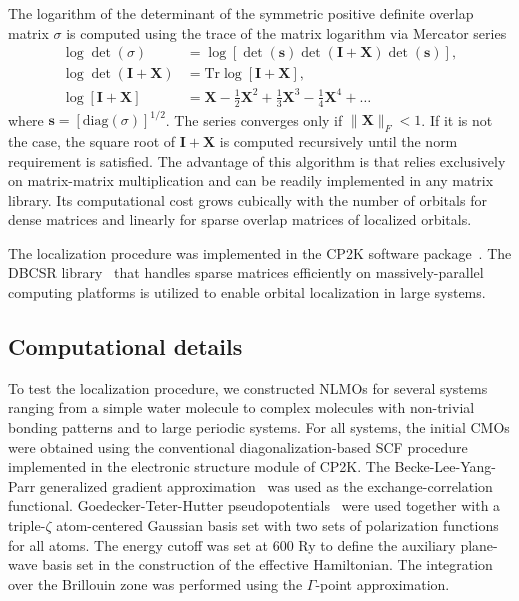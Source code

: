 \documentclass[aps,prl,reprint,amsmath,amssymb]{revtex4-1}
\begin{document}
The logarithm of the determinant of the symmetric positive definite overlap matrix $\sigma$ is computed using the trace of the matrix logarithm via Mercator series
%
\begin{equation} \label{eq:mercator}
\begin{split}
\log \det \left( \sigma \right) &= \log \left[ \det(\mathbf{s}) \det(\mathbf{I} + \mathbf{X}) \det(\mathbf{s}) \right], \\
\log \det \left( \mathbf{I} + \mathbf{X} \right) &= \text{Tr} \log \left[ \mathbf{I} + \mathbf{X} \right], \\
\log \left[ \mathbf{I} + \mathbf{X} \right] &= \mathbf{X} - \frac{1}{2}\mathbf{X}^2  + \frac{1}{3}\mathbf{X}^3 - \frac{1}{4}\mathbf{X}^4 + \ldots
\end{split}
\end{equation}
%
where $\mathbf{s}=\left[\text{diag}(\sigma)\right]^{1/2}$. The series converges only if $\|\mathbf{X}\|_F < 1$. If it is not the case, the square root of $\mathbf{I}+\mathbf{X}$ is computed recursively until the norm requirement is satisfied. The advantage of this algorithm is that relies exclusively on matrix-matrix multiplication and can be readily implemented in any matrix library. Its computational cost grows cubically with the number of orbitals for dense matrices and linearly for sparse overlap matrices of localized orbitals.

The localization procedure was implemented in the CP2K software package~\cite{cp2kgeneral}. The DBCSR library~\cite{borvstnik2014sparse} that handles sparse matrices efficiently on massively-parallel computing platforms is utilized to enable orbital localization in large systems.

\subsection{Computational details}

To test the localization procedure, we constructed NLMOs for several systems ranging from a simple water molecule to complex molecules with non-trivial bonding patterns and to large periodic systems. 
%
For all systems, the initial CMOs were obtained using the conventional diagonalization-based SCF procedure implemented in the electronic structure module of CP2K. 
The Becke-Lee-Yang-Parr generalized gradient approximation~\cite{becke1988density, lee1988development} was used as the exchange-correlation functional.
Goedecker-Teter-Hutter pseudopotentials~\cite{goedecker1996separable} were used together with a triple-$\zeta$ atom-centered Gaussian basis set with two sets of polarization functions for all atoms. 
The energy cutoff was set at 600 Ry to define the auxiliary plane-wave basis set in the construction of the effective Hamiltonian. 
The integration over the Brillouin zone was performed using the $\Gamma$-point approximation.
\end{document}
